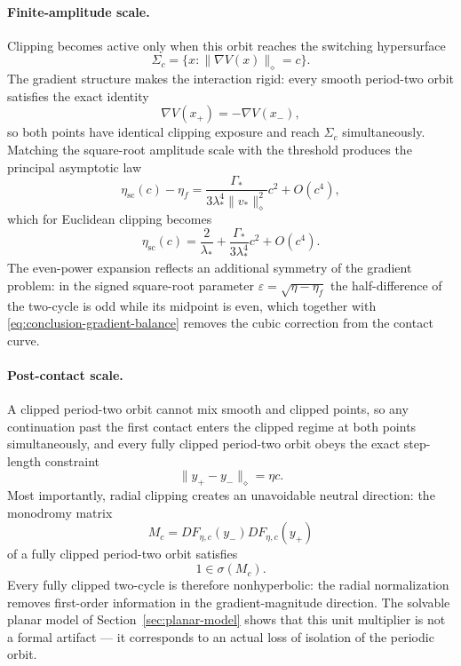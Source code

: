 \paragraph{Finite-amplitude scale.}
Clipping becomes active only when this orbit reaches the switching
hypersurface
\[
\Sigma_c
=
\{x:\|\nabla V(x)\|_\diamond=c\}.
\]
The gradient structure makes the interaction rigid: every smooth
period-two orbit satisfies the exact identity
\begin{equation}
\nabla V(x_+)
=
-\nabla V(x_-),
\label{eq:conclusion-gradient-balance}
\end{equation}
so both points have identical clipping exposure and reach $\Sigma_c$
simultaneously.  Matching the square-root amplitude scale with the
threshold produces the principal asymptotic law
\begin{equation}
\boxed{
\eta_{\mathrm{sc}}(c)-\eta_f
=
\frac{\Gamma_*}{
3\lambda_*^4
\|v_*\|_\diamond^2
}
c^2
+
O(c^4),
}
\label{eq:conclusion-main-law}
\end{equation}
which for Euclidean clipping becomes
\begin{equation}
\boxed{
\eta_{\mathrm{sc}}(c)
=
\frac{2}{\lambda_*}
+
\frac{\Gamma_*}{
3\lambda_*^4
}
c^2
+
O(c^4).
}
\label{eq:conclusion-euclidean}
\end{equation}
The even-power expansion reflects an additional symmetry of the
gradient problem: in the signed square-root parameter
$\varepsilon=\sqrt{\eta-\eta_f}$ the half-difference of the two-cycle
is odd while its midpoint is even, which together with
\eqref{eq:conclusion-gradient-balance} removes the cubic correction
from the contact curve.

\paragraph{Post-contact scale.}
A clipped period-two orbit cannot mix smooth and clipped points, so
any continuation past the first contact enters the clipped regime at
both points simultaneously, and every fully clipped period-two orbit
obeys the exact step-length constraint
\begin{equation}
\|y_+-y_-\|_\diamond
=
\eta c.
\label{eq:conclusion-step-law}
\end{equation}
Most importantly, radial clipping creates an unavoidable neutral
direction: the monodromy matrix
\[
M_c
=
DF_{\eta,c}(y_-)
DF_{\eta,c}(y_+)
\]
of a fully clipped period-two orbit satisfies
\begin{equation}
\boxed{
1\in\sigma(M_c).
}
\label{eq:conclusion-unit}
\end{equation}
Every fully clipped two-cycle is therefore nonhyperbolic: the radial
normalization removes first-order information in the
gradient-magnitude direction.  The solvable planar model of
Section~\ref{sec:planar-model} shows that this unit multiplier is not
a formal artifact --- it corresponds to an actual loss of isolation of
the periodic orbit.

